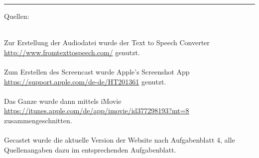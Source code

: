 \documentclass[a4paper]{article}
\begin{document}
\par
\vskip2cm
\rule{12cm}{0.6pt}
\vskip1cm
\begin{Large}
Quellen:\\\\
\end{Large}
Zur Erstellung der Audiodatei wurde der Text to Speech Converter \url{http://www.fromtexttospeech.com/} genutzt.\\\\
Zum Erstellen des Screencast wurde Apple's Screenshot App \url{https://support.apple.com/de-de/HT201361} genutzt.\\\\
Das Ganze wurde dann mittels iMovie \url{https://itunes.apple.com/de/app/imovie/id377298193?mt=8} zusammengeschnitten.\\\\
Gecastet wurde die aktuelle Version der Website nach Aufgabenblatt 4, alle Quellenangaben dazu im entsprechenden Aufgabenblatt.
\end{document}
